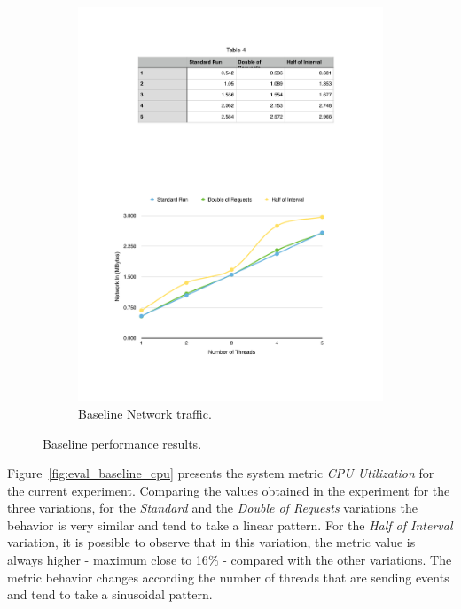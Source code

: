 \begin{figure}[ht!]
\begin{subfigure}{.5\textwidth}
  \includegraphics[width=\linewidth]{./images/network_1_lap}
  \caption{Baseline Network traffic.}
  \label{fig:eval_baseline_network}
\end{subfigure}
\caption{Baseline performance results.}
\label{fig:eval_baseline_results}
\end{figure}

Figure~\ref{fig:eval_baseline_cpu} presents the system metric \textit{CPU Utilization} for the current
experiment. Comparing the values obtained in the experiment for the three variations, for the
\textit{Standard} and the \textit{Double of Requests} variations the behavior is very similar and tend
to take a linear pattern. For the \textit{Half of Interval} variation, it is possible to observe
that in this variation, the metric value is always higher - maximum close to 16$\%$ - compared with the other
variations. The metric behavior changes according the number of threads that are sending events and
tend to take a sinusoidal pattern.\\


